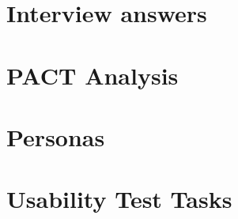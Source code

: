 \chapter{Interview answers}


\chapter{PACT Analysis}






\chapter{Personas} \label{PersonasAppendix}


\chapter{Usability Test Tasks}
